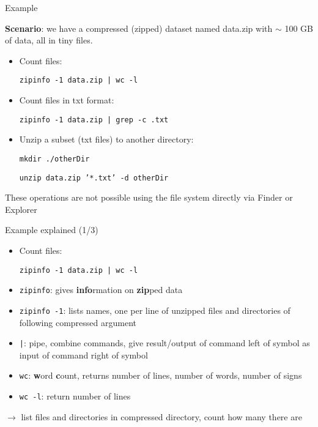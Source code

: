\documentclass[hyperref={pdfpagelabels=false},aspectratio=169]{beamer}
\begin{document}
\begin{frame}{Example}

    \textbf{Scenario}: we have a compressed (zipped) dataset named data.zip with $\sim$ 100 GB of data, all in tiny files.

    \begin{itemize}
        \item[1.] Count files:
        
        \texttt{zipinfo -1 data.zip | wc -l}
        \vspace{5pt}
        \item[2.] Count files in txt format:

        \texttt{zipinfo -1 data.zip | grep -c .txt}
        \vspace{5pt}
        \item[3.] Unzip a subset (txt files) to another directory:
        
        \texttt{mkdir ./otherDir}

        \texttt{unzip data.zip '*.txt' -d otherDir}
    \end{itemize}
    
    \vspace{10pt}

    These operations are not possible using the file system directly via Finder or Explorer
\end{frame}

\begin{frame}{Example explained \small (1/3)}

    \begin{itemize}
        \item[1.] Count files:
        
        \texttt{zipinfo -1 data.zip | wc -l}
    \end{itemize}
    
    \begin{itemize}
        \item \texttt{zipinfo}: gives \textbf{info}rmation on \textbf{zip}ped data
        \item \texttt{zipinfo -1}: lists names, one per line of unzipped files and directories of following compressed argument
        \item \texttt{|}: pipe, combine commands, give result/output of command left of symbol as input of command right of symbol
        \item \texttt{wc}: \textbf{w}ord \textbf{c}ount, returns number of lines, number of words, number of signs
        \item \texttt{wc -l}: return number of lines
    \end{itemize}
    
    \vspace{10pt}

    $\rightarrow$ list files and directories in compressed directory, count how many there are
\end{frame}
\end{document}
